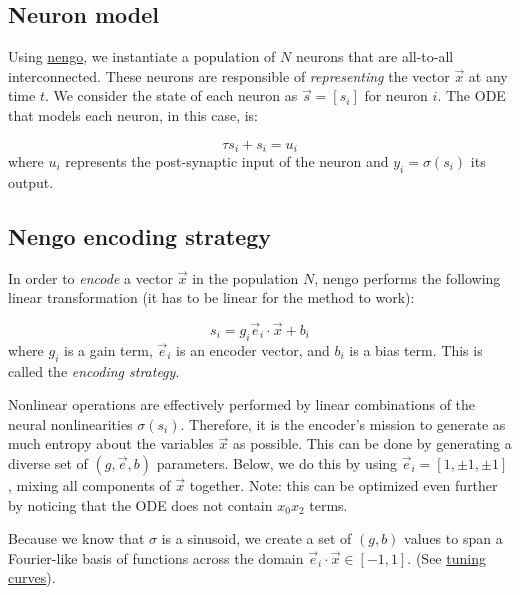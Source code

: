 \documentclass{report}
\begin{document}
\subsection{Neuron model}\label{neuron-model}

Using \href{http://www.nengo.ca}{nengo}, we instantiate a population of
\(N\) neurons that are all-to-all interconnected. These neurons are
responsible of \emph{representing} the vector \(\vec x\) at any time
\(t\). We consider the state of each neuron as \(\vec s = [s_i]\) for
neuron \(i\). The ODE that models each neuron, in this case, is:

\[\tau s_i + s_i = u_i \] where \(u_i\) represents the post-synaptic
input of the neuron and \(y_i=\sigma(s_i)\) its output.

\subsection{Nengo encoding strategy}\label{nengo-encoding-strategy}

In order to \emph{encode} a vector \(\vec x\) in the population \(N\),
nengo performs the following linear transformation (it has to be linear
for the method to work):

\[ s_i = g_i \vec e_i \cdot \vec x + b_i \] where \(g_i\) is a gain
term, \(\vec e_i\) is an encoder vector, and \(b_i\) is a bias term.
This is called the \emph{encoding strategy}.

Nonlinear operations are effectively performed by linear combinations of
the neural nonlinearities \(\sigma(s_i)\). Therefore, it is the
encoder's mission to generate as much entropy about the variables
\(\vec x\) as possible. This can be done by generating a diverse set of
\((g, \vec e, b)\) parameters. Below, we do this by using
\(\vec e_i = [1, \pm 1, \pm1]\), mixing all components of \(\vec x\)
together. Note: this can be optimized even further by noticing that the
ODE does not contain \(x_0 x_2\) terms.

Because we know that \(\sigma\) is a sinusoid, we create a set of
\((g,b)\) values to span a Fourier-like basis of functions across the
domain \(\vec e_i \cdot \vec x \in [-1,1]\). (See
\protect\hyperlink{tuning_curves}{tuning curves}).
\end{document}
